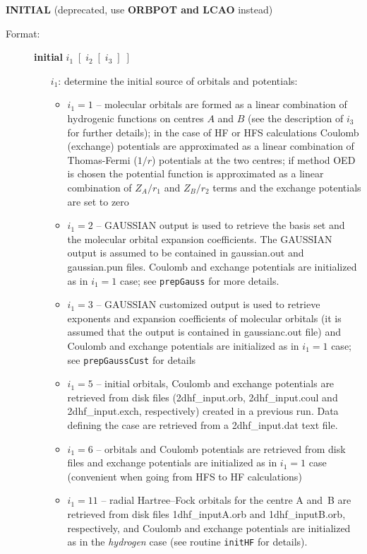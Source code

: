 \documentclass[12pt,a4paper]{article}
\newcommand{\ft}[1]{\texttt{#1}}
\begin{document}
\begin{description}
\item \textbf{INITIAL} (deprecated, use \textbf{ORBPOT and LCAO} instead)
\begin{description}
\item[Format:] \textbf{initial} $i_1\;[\;i_2\;[\;i_3\;]\;]$
\begin{itemize}
\item[$i_1$:] determine the initial source of orbitals and potentials:
\begin{itemize}
\item $i_1=1$ --   molecular orbitals are formed as a linear
  combination of hydrogenic functions on centres $A$ and $B$ (see
  the description of $i_3$ for further details);
  in the case of HF or HFS calculations Coulomb
  (exchange) potentials are approximated as a linear combination of
  Thomas-Fermi ($1/r$) potentials at the two centres; if method OED is
  chosen the potential function is approximated as a linear
  combination of $Z_A/r_1$ and $Z_B/r_2$ terms and the exchange
  potentials are set to zero

\item $i_1=2$ -- GAUSSIAN output is used to retrieve the basis set and
  the molecular orbital expansion coefficients. The GAUSSIAN output is
  assumed to be contained in gaussian.out and gaussian.pun files.
  Coulomb and exchange potentials are initialized as in $i_1=1$ case;
  see \ft{prepGauss} for more details.

\item $i_1=3$ -- GAUSSIAN customized output is used to retrieve
  exponents and expansion coefficients of molecular orbitals (it is
  assumed that the output is contained in gaussianc.out file) and
  Coulomb and exchange potentials are initialized as in $i_1=1$ case;
  see \ft{prepGaussCust} for details

\item $i_1=5$ -- initial orbitals, Coulomb and exchange potentials are
  retrieved from disk files (2dhf\_input.orb, 2dhf\_input.coul and
  2dhf\_input.exch, respectively) created in a previous run. Data
  defining the case are retrieved from a 2dhf\_input.\-dat text file.

\item $i_1=6$ -- orbitals and Coulomb potentials are retrieved from
  disk files and exchange potentials are initialized as in $i_1=1$
  case (convenient when going from HFS to HF calculations)

\item $i_1=11$ -- radial Hartree--Fock orbitals for the centre A and~B
  are retrieved from disk files 1dhf\_inputA.orb and 1dhf\_inputB.orb,
  respectively, and Coulomb and exchange potentials are initialized as
  in the \textsl{hydrogen} case (see routine \ft{initHF} for details).


\end{itemize}
\end{itemize}
\end{description}
\end{description}
\end{document}
